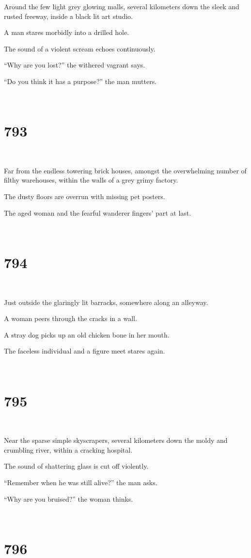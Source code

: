 \documentclass{report}
\begin{document}
Around the few light grey glowing malls, several kilometers down the sleek and rusted freeway, inside a black lit art studio.

A man stares morbidly into a drilled hole.

The sound of a violent scream echoes continuously.

``Why are you lost?'' the withered vagrant says.

``Do you think it has a purpose?'' the man mutters.

~
\chapter*{793}
~

Far from the endless towering brick houses, amongst the overwhelming number of filthy warehouses, within the walls of a grey grimy factory.

The dusty floors are overrun with missing pet posters.

The aged woman and the fearful wanderer fingers' part at last.

~
\chapter*{794}
~

Just outside the glaringly lit barracks, somewhere along an alleyway.

A woman peers through the cracks in a wall.

A stray dog picks up an old chicken bone in her mouth.

The faceless individual and a figure meet stares again.

~
\chapter*{795}
~

Near the sparse simple skyscrapers, several kilometers down the moldy and crumbling river, within a cracking hospital.

The sound of shattering glass is cut off violently.

``Remember when he was still alive?'' the man asks.

``Why are you bruised?'' the woman thinks.

~
\chapter*{796}
~
\end{document}
